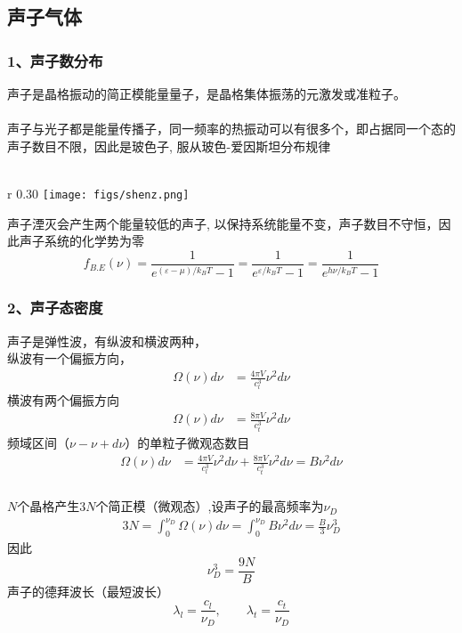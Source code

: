 \subsection{声子气体}
\begin{frame}[label=current]
  \frametitle{ 1、声子数分布}
  {声子是晶格振动的简正模能量量子}，是晶格集体振荡的元激发或准粒子。\\
  ~~\\ 
  声子与光子都是能量传播子，同一频率的热振动可以有很多个，即占据同一个态的声子数目不限，因此是玻色子, 服从玻色-爱因斯坦分布规律 \\
  ~~\\
  \begin{wrapfigure} {r} {0.30\textwidth} %
    \texttt{[image: figs/shenz.png]}   
\end{wrapfigure}
  声子湮灭会产生两个能量较低的声子, 以保持系统能量不变，声子数目不守恒，因此声子系统的化学势为零\\
  \[f_{B.E}(\nu) = \frac{1}{e^{(\varepsilon - \mu)/k_B T}-1} = \frac{1}{e^{\varepsilon /k_B T}-1} = \frac{1}{e^{h \nu /k_B T}-1}\]
\end{frame} 

\begin{frame}[label=current]
  \frametitle{ 2、声子态密度}
  声子是弹性波，有纵波和横波两种，\\
  纵波有一个偏振方向，
  \[ \begin{aligned}
    \Omega (\nu) d \nu 
    &= \frac{4\pi V}{c_l^3} \nu^2  d \nu
  \end{aligned}
   \]
  横波有两个偏振方向 \\
  \[ 
    \begin{aligned}
      \Omega (\nu) d \nu 
      &= \frac{8\pi V}{c_t^3} \nu^2  d \nu
    \end{aligned}
     \]
  频域区间（$\nu - \nu + d \nu$）的单粒子微观态数目
  \[ 
\begin{aligned}
  \Omega (\nu) d \nu 
  &= \frac{4\pi V}{c_l^3} \nu^2  d \nu + \frac{8\pi V}{c_t^3} \nu^2  d \nu = B \nu^2  d \nu
\end{aligned}
 \]
\end{frame} 

\begin{frame}[label=current]
  \frametitle{}
$N$个晶格产生$3N$个简正模（微观态）,设声子的最高频率为$\nu _D$
\[ 
\begin{aligned}
  3N= \int_{0}^{\nu _D}\Omega (\nu) d \nu = \int_{0}^{\nu _D} B \nu^2  d \nu = \frac{B}{3} \nu _D^3
\end{aligned}
\]
因此
\[ \nu _D^3 = \frac{9N}{B} \]
声子的德拜波长（最短波长）
\[ \lambda _l = \frac{c_l}{\nu _D}, \qquad \lambda _t = \frac{c_t}{\nu _D}\]
\end{frame} 

